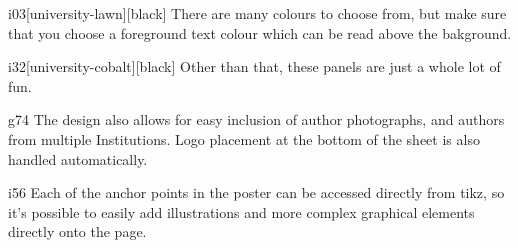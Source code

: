 \documentclass{guposter}
\begin{document}
  \begin{fillpanel}{i0}{3}[university-lawn][black]
    There are many colours to choose from, but make sure that you
    choose a foreground text colour which can be read above the
    bakground.
  \end{fillpanel}

  \begin{fillpanel}{i3}{2}[university-cobalt][black]
      Other than that, these panels are just a whole lot of fun.
 \end{fillpanel}
 
 \begin{panel}{g7}{4}
   The design also allows for easy inclusion of author photographs,
   and authors from multiple Institutions. Logo placement at the
   bottom of the sheet is also handled automatically.
 \end{panel}

  \begin{panel}{i5}{6}
    Each of the anchor points in the poster can be accessed directly
    from tikz, so it's possible to easily add illustrations and more
    complex graphical elements directly onto the page.
    
 \end{panel}

  

 
\end{document}
